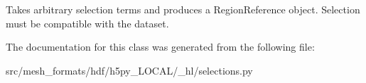 \begin{DoxyVerb}Takes arbitrary selection terms and produces a RegionReference
object.  Selection must be compatible with the dataset.
\end{DoxyVerb}
 

The documentation for this class was generated from the following file\+:\begin{DoxyCompactItemize}
\item 
src/mesh\+\_\+formats/hdf/h5py\+\_\+\+L\+O\+C\+A\+L/\+\_\+hl/selections.\+py\end{DoxyCompactItemize}
